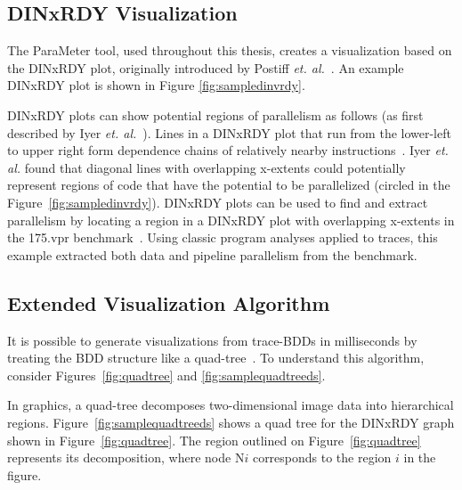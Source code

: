 \documentclass[defaultstyle,11pt]{thesis}
\begin{document}
\subsection{DINxRDY Visualization}

The ParaMeter tool, used throughout this thesis, creates a
visualization based on the DINxRDY plot, originally introduced by
Postiff \textit{et. al.}~\cite{postiff:98:um}.  An example DINxRDY plot is shown
in Figure \ref{fig:sampledinvrdy}.

DINxRDY plots can show potential regions of parallelism as follows (as
first described by Iyer \textit{et. al.}~\cite{iyer:05:epic}).  Lines
in a DINxRDY plot that run from the lower-left to upper right form
dependence chains of relatively nearby
instructions~\cite{iyer:05:epic}.  Iyer \textit{et. al.} found that
diagonal lines with overlapping x-extents could potentially represent
regions of code that have the potential to be parallelized (circled in
the Figure~\ref{fig:sampledinvrdy}).  DINxRDY plots can be used to
find and extract parallelism by locating a region in a DINxRDY plot
with overlapping x-extents in the 175.vpr
benchmark~\cite{price:08:pact}.  Using classic program analyses
applied to traces, this example extracted both data and pipeline
parallelism from the benchmark.

\subsection{Extended Visualization Algorithm}

It is possible to generate visualizations from trace-BDDs in
milliseconds by treating the BDD structure like a
quad-tree~\cite{price:08:pact}.  To understand this algorithm,
consider Figures~\ref{fig:quadtree} and \ref{fig:samplequadtreeds}.

In graphics, a quad-tree decomposes two-dimensional image data into
hierarchical regions. Figure~\ref{fig:samplequadtreeds} shows a quad
tree for the DINxRDY graph shown in Figure~\ref{fig:quadtree}.  The
region outlined on Figure~\ref{fig:quadtree} represents its
decomposition, where node N$i$ corresponds to the region $i$ in the
figure.
\end{document}
